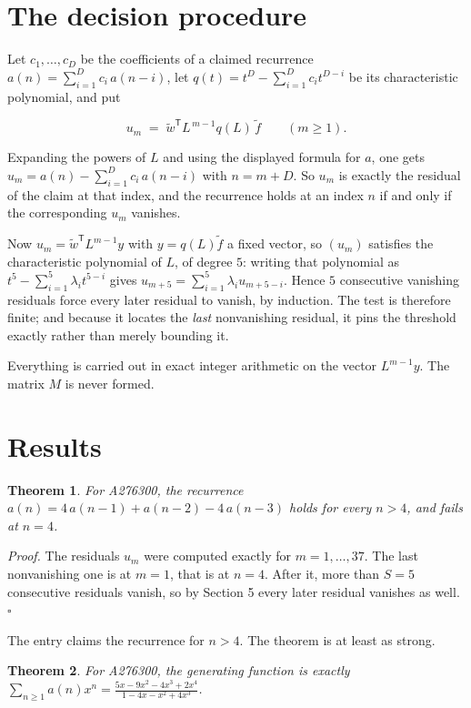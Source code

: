 \documentclass[11pt]{article}
\newtheorem{theorem}{Theorem}
\theoremstyle{definition}
\begin{document}
\section{The decision procedure}

Let $c_1,\dots,c_D$ be the coefficients of a claimed recurrence $a(n) = \sum_{i=1}^{D} c_i\,a(n-i)$, let $q(t) = t^{D} - \sum_{i=1}^{D} c_i t^{D-i}$ be its characteristic polynomial, and put

\[u_m \;=\; \tilde w^{\mathsf T} L^{\,m-1} q(L)\,\tilde f \qquad (m \ge 1).\]

Expanding the powers of $L$ and using the displayed formula for $a$, one gets $u_m = a(n) - \sum_{i=1}^{D} c_i\,a(n-i)$ with $n = m + D$. So $u_m$ is exactly the residual of the claim at that index, and the recurrence holds at an index $n$ if and only if the corresponding $u_m$ vanishes.

Now $u_m = \tilde w^{\mathsf T} L^{m-1} y$ with $y = q(L)\tilde f$ a fixed vector, so $(u_m)$ satisfies the characteristic polynomial of $L$, of degree $5$: writing that polynomial as $t^{5} - \sum_{i=1}^{5} \lambda_i t^{5-i}$ gives $u_{m+5} = \sum_{i=1}^{5} \lambda_i u_{m+5-i}$. Hence $5$ consecutive vanishing residuals force every later residual to vanish, by induction. The test is therefore finite; and because it locates the {\itshape last} nonvanishing residual, it pins the threshold exactly rather than merely bounding it.

Everything is carried out in exact integer arithmetic on the vector $L^{m-1}y$. The matrix $M$ is never formed.

\section{Results}

\begin{theorem} For A276300, the recurrence $a(n) = 4\,a(n-1) + a(n-2) - 4\,a(n-3)$ holds for every $n > 4$, and fails at $n = 4$.\end{theorem}

{\itshape Proof.} The residuals $u_m$ were computed exactly for $m = 1,\dots,37$. The last nonvanishing one is at $m = 1$, that is at $n = 4$. After it, more than $S = 5$ consecutive residuals vanish, so by Section 5 every later residual vanishes as well. $\square$

The entry claims the recurrence for $n > 4$. The theorem is at least as strong.

\begin{theorem} For A276300, the generating function is exactly $\sum_{n\ge 1} a(n)x^n = \frac{5x - 9x^{2} - 4x^{3} + 2x^{4}}{1 - 4x - x^{2} + 4x^{3}}$.\end{theorem}
\end{document}
